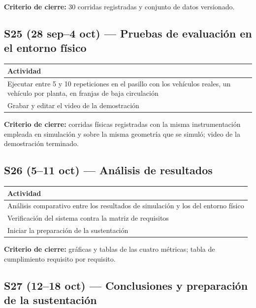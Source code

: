 \documentclass[12pt,letterpaper]{article}
\begin{document}
\textbf{Criterio de cierre:} 30 corridas registradas y conjunto de datos versionado.

\subsection{S25 (28 sep--4 oct) --- Pruebas de evaluación en el entorno físico}

\begin{table}[H]
    \centering
    \small
    \begin{tabular}{@{}p{13.8cm}@{}}
        \toprule
        \textbf{Actividad} \\ \midrule
        Ejecutar entre 5 y 10 repeticiones en el pasillo con los vehículos reales, un vehículo por planta, en franjas de baja circulación \\
        Grabar y editar el video de la demostración \\ \bottomrule
    \end{tabular}
\end{table}

\textbf{Criterio de cierre:} corridas físicas registradas con la misma instrumentación empleada en simulación y sobre la misma geometría que se simuló; video de la demostración terminado.

\subsection{S26 (5--11 oct) --- Análisis de resultados}

\begin{table}[H]
    \centering
    \small
    \begin{tabular}{@{}p{13.8cm}@{}}
        \toprule
        \textbf{Actividad} \\ \midrule
        Análisis comparativo entre los resultados de simulación y los del entorno físico \\
        Verificación del sistema contra la matriz de requisitos \\
        Iniciar la preparación de la sustentación \\ \bottomrule
    \end{tabular}
\end{table}

\textbf{Criterio de cierre:} gráficas y tablas de las cuatro métricas; tabla de cumplimiento requisito por requisito.

\subsection{S27 (12--18 oct) --- Conclusiones y preparación de la sustentación}
\end{document}

